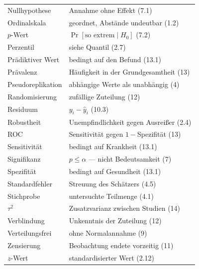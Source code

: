\begin{merksatz}
\begin{center}
{\begin{longtable}{@{}P{3.2cm}P{5.4cm}@{}}
Nullhypothese & Annahme ohne Effekt (7.1)\\
Ordinalskala & geordnet, Abstände undeutbar (1.2)\\
$p$-Wert & $\Pr[\text{so extrem} \mid H_0]$ (7.2)\\
Perzentil & siehe Quantil (2.7)\\
Prädiktiver Wert & bedingt auf den Befund (13.1)\\
Prävalenz & Häufigkeit in der Grundgesamtheit (13)\\
Pseudoreplikation & abhängige Werte als unabhängig (4)\\
Randomisierung & zufällige Zuteilung (12)\\
Residuum & $y_i - \hat y_i$ (10.3)\\
Robustheit & Unempfindlichkeit gegen Ausreißer (2.4)\\
ROC & Sensitivität gegen $1-$Spezifität (13)\\
Sensitivität & bedingt auf Krankheit (13.1)\\
Signifikanz & $p \le \alpha$ --- nicht Bedeutsamkeit (7)\\
Spezifität & bedingt auf Gesundheit (13.1)\\
Standardfehler & Streuung des Schätzers (4.5)\\
Stichprobe & untersuchte Teilmenge (4.1)\\
$\tau^2$ & Zusatzvarianz zwischen Studien (14)\\
Verblindung & Unkenntnis der Zuteilung (12)\\
Verteilungsfrei & ohne Normalannahme (9)\\
Zensierung & Beobachtung endete vorzeitig (11)\\
$z$-Wert & standardisierter Wert (2.12)\\
\bottomrule
\end{longtable}}
\end{center}
\end{merksatz}
